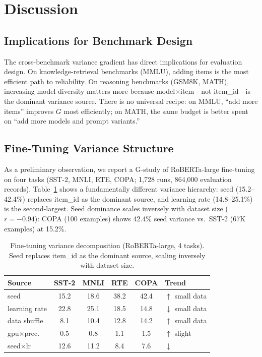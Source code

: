 \documentclass[11pt,a4paper]{article}
\newcommand{\Gcoeff}{\ensuremath{G}}
\begin{document}
\section{Discussion}

\subsection{Implications for Benchmark Design}

The cross-benchmark variance gradient has direct implications for evaluation design.
On knowledge-retrieval benchmarks (MMLU), adding items is the most efficient path to reliability.
On reasoning benchmarks (GSM8K, MATH), increasing model diversity matters more because model$\times$item---not item\_id---is the dominant variance source.
There is no universal recipe: on MMLU, ``add more items'' improves $\Gcoeff$ most efficiently; on MATH, the same budget is better spent on ``add more models and prompt variants.''

\subsection{Fine-Tuning Variance Structure}
\label{sec:finetune}

As a preliminary observation, we report a G-study of RoBERTa-large fine-tuning on four tasks (SST-2, MNLI, RTE, COPA; 1,728 runs, 864,000 evaluation records).
Table~\ref{tab:finetune} shows a fundamentally different variance hierarchy: seed (15.2--42.4\%) replaces item\_id as the dominant source, and learning rate (14.8--25.1\%) is the second-largest.
Seed dominance scales inversely with dataset size ($r=-0.94$): COPA (100 examples) shows 42.4\% seed variance vs.\ SST-2 (67K examples) at 15.2\%.

\begin{table}[t]
\centering
\caption{Fine-tuning variance decomposition (RoBERTa-large, 4 tasks). Seed replaces item\_id as the dominant source, scaling inversely with dataset size.}
\label{tab:finetune}
\small
\begin{tabular}{lccccl}
\toprule
\textbf{Source} & \textbf{SST-2} & \textbf{MNLI} & \textbf{RTE} & \textbf{COPA} & \textbf{Trend} \\
\midrule
seed           & 15.2 & 18.6 & 38.2 & 42.4 & $\uparrow$ small data \\
learning rate  & 22.8 & 25.1 & 18.5 & 14.8 & $\downarrow$ small data \\
data shuffle   &  8.1 & 10.4 & 12.8 & 14.2 & $\uparrow$ small data \\
gpu$\times$prec. & 0.5 & 0.8  & 1.1  & 1.5  & $\uparrow$ slight \\
seed$\times$lr   & 12.6 & 11.2 & 8.4  & 7.6  & $\downarrow$ \\
\bottomrule
\end{tabular}
\end{table}
\end{document}
